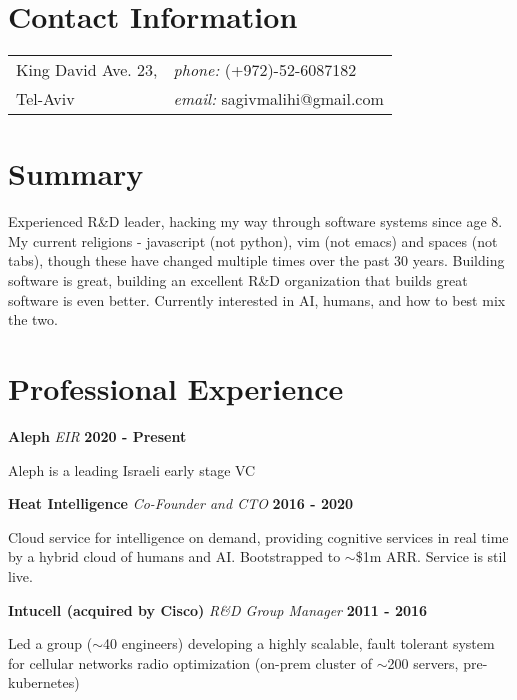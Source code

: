 \documentclass[margin,line]{res}
\newenvironment{list1}{
  \begin{list}{\ding{113}}{%
      \setlength{\itemsep}{0in}
      \setlength{\parsep}{0in} \setlength{\parskip}{0in}
      \setlength{\topsep}{0in} \setlength{\partopsep}{0in} 
      \setlength{\leftmargin}{0.2in}}}{\end{list}}
\begin{document}

\begin{resume}
\section{\sc Contact Information}
\vspace{.05in}
\begin{tabular}{@{}p{2in}p{4in}}
King David Ave. 23,       & {\it phone:}  (+972)-52-6087182 \\
Tel-Aviv           & {\it email:}  sagivmalihi@gmail.com \\
\end{tabular}

\section{\sc Summary}
Experienced R\&D leader, hacking my way through software systems since age 8. My current religions - javascript (not python), vim (not emacs) and spaces (not tabs), though these have changed multiple times over the past 30 years. Building software is great, building an excellent R\&D organization that builds great software is even better.
Currently interested in AI, humans, and how to best mix the two.

\section{\sc Professional Experience}
{\bf Aleph}
{\em EIR} \hfill {\bf 2020 - Present} 
\begin{list1}
\item[] Aleph is a leading Israeli early stage VC
\end{list1}

{\bf Heat Intelligence}
{\em Co-Founder and CTO} \hfill {\bf 2016 - 2020} 
\begin{list1}
\item[] Cloud service for intelligence on demand, providing cognitive services in real time by a hybrid cloud of humans and AI. Bootstrapped to $\sim$\$1m ARR. Service is stil live.
\end{list1}

{\bf Intucell (acquired by Cisco)}
{\em R\&D Group Manager} \hfill {\bf 2011 - 2016} 
\begin{list1}
\item[] Led a group ($\sim$40 engineers) developing a highly scalable, fault tolerant system for cellular networks radio optimization (on-prem cluster of $\sim$200 servers, pre-kubernetes)
\end{list1}


\end{resume}
\end{document}
